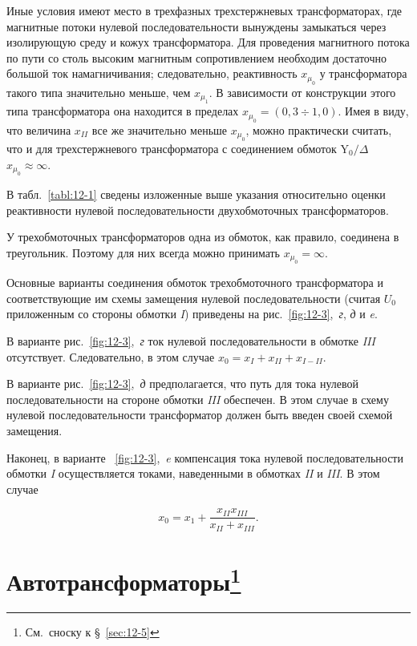 Иные условия имеют место в трехфазных трехстержневых трансформаторах, где магнитные потоки нулевой последовательности вынуждены замыкаться через изолирующую среду и кожух трансформатора. Для проведения магнитного потока по пути со столь высоким магнитным сопротивлением необходим достаточно большой ток намагничивания; следовательно, реактивность $ x_{\mu_0} $ у трансформатора такого типа значительно меньше, чем $ x_{\mu_1} $. В зависимости от конструкции этого типа трансформатора она находится в пределах $ x_{\mu_0} = (0,3 \div 1,0 ) $. Имея в виду, что величина $ x_{II} $ все же значительно меньше $ x_{\mu_0} $, можно практически считать, что и для трехстержневого трансформатора с соединением обмоток $ \text{Y}_0 / \Delta $ ~~ $ x_{\mu_0} \approx \infty $.

В табл.~\ref{tabl:12-1} сведены изложенные выше указания относительно оценки реактивности нулевой последовательности двухобмоточных трансформаторов.


У трехобмоточных трансформаторов одна из обмоток, как правило, соединена в треугольник. Поэтому для них всегда можно принимать $ x_{\mu_0} = \infty $.

Основные варианты соединения обмоток трехобмоточного трансформатора и соответствующие им схемы замещения нулевой последовательности (считая $ U_0 $ приложенным со стороны обмотки \textit{I}) приведены на рис.~\ref{fig:12-3},~\textit{г}, \textit{д} и \textit{e}.

В варианте рис.~\ref{fig:12-3},~\textit{г} ток нулевой последовательности в обмотке \textit{III} отсутствует. Следовательно, в этом случае $ x_0 = x_I + x_{II} + x_{I-II} $.

В варианте рис.~\ref{fig:12-3},~\textit{д} предполагается, что путь для тока нулевой последовательности на стороне обмотки \textit{III} обеспечен. В этом случае в схему нулевой последовательности трансформатор должен быть введен своей схемой замещения.

Наконец, в варианте ~\ref{fig:12-3},~\textit{e} компенсация тока нулевой последовательности обмотки \textit{I} осуществляется токами, наведенными в обмотках \textit{II} и \textit{III}. В этом случае

\begin{equation*}
	x_0 = x_1 + \frac{ x_{II} x_{III} }{ x_{II} + x_{III} } \text{.}
\end{equation*}

\section{Автотрансформаторы\protect\footnote{См.~сноску к §~\ref{sec:12-5}}}
\label{sec:12-6}

